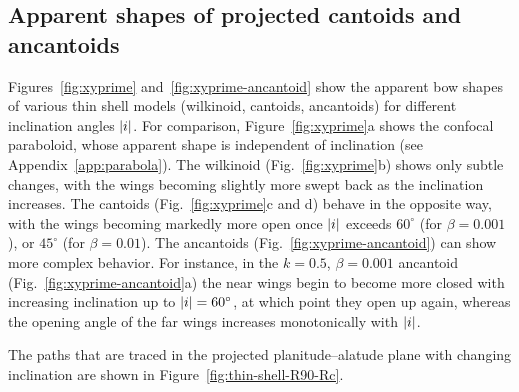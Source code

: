 \subsection{Apparent shapes of projected cantoids and ancantoids}
\label{sec:proj-shap-cant}

Figures~\ref{fig:xyprime} and~\ref{fig:xyprime-ancantoid} show the
apparent bow shapes of various thin shell models (wilkinoid, cantoids,
ancantoids) for different inclination angles \(\lvert i\rvert\).  For
comparison, Figure~\ref{fig:xyprime}a shows the confocal paraboloid,
whose apparent shape is independent of inclination (see
Appendix~\ref{app:parabola}).  The wilkinoid (Fig.~\ref{fig:xyprime}b)
shows only subtle changes, with the wings becoming slightly more swept
back as the inclination increases.  The cantoids
(Fig.~\ref{fig:xyprime}c and d) behave in the opposite way, with the
wings becoming markedly more open once \(\lvert i\rvert\) exceeds
\(60^\circ\) (for \(\beta = 0.001\)), or \(45^\circ\) (for
\(\beta = 0.01\)).  The ancantoids (Fig.~\ref{fig:xyprime-ancantoid}) can
show more complex behavior.  For instance, in the \(k = 0.5\),
\(\beta = 0.001\) ancantoid (Fig.~\ref{fig:xyprime-ancantoid}a) the near
wings begin to become more closed with increasing inclination up to
\(\lvert i\rvert = 60^\circ\), at which point they open up again, whereas the
opening angle of the far wings increases monotonically with
\(\lvert i\rvert\).

The paths that are traced in the projected planitude--alatude plane
with changing inclination are shown in
Figure~\ref{fig:thin-shell-R90-Rc}.







